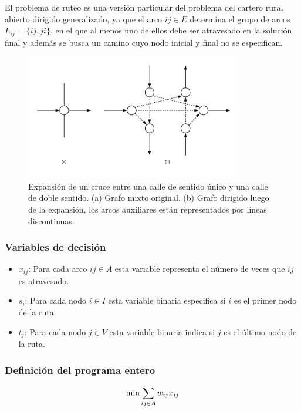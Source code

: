 \documentclass[spanish, conference]{IEEEtran}
\begin{document}
El problema de ruteo es una versión particular del problema del cartero rural abierto dirigido generalizado, ya que el arco $i j \in E $ determina el grupo de arcos $L_{i j} = \{i j, j i\}$, en el que al menos uno de ellos debe ser atravesado en la solución final y además se busca un camino cuyo nodo inicial y final no se especifican.

\begin{figure}[tbp]
\centerline{\includegraphics[width=9.5cm]{imagenes/expanded_graph.png}}
\caption{Expansión de un cruce entre una calle de sentido único y una calle de doble sentido. (a) Grafo mixto original. (b) Grafo dirigido luego de la expansión, los arcos auxiliares están representados por líneas discontinuas. \cite{Braier2017AnArgentina}}
\label{fig:grafo_expandido}
\end{figure}

\subsubsection{Variables de decisión}
\begin{itemize}
\item $x_{i j}$: Para cada arco $ {i j} \in A$ esta variable representa el número de veces que $i j$ es atravesado.

\item $s_i$: Para cada nodo $i \in I$ esta variable binaria especifica si  $i$ es el primer nodo de la ruta.

\item $t_j$: Para cada nodo $j \in V$ esta variable binaria indica si $j$ es el último nodo de la ruta.
\end{itemize}

\subsubsection{Definición del programa entero}
\label{sec:programa-entero}
\begin{equation*}
\min \sum_{i j \in A} w_{i j} x_{i j}  \\
\end{equation*} 
\hbox{}
\end{document}
